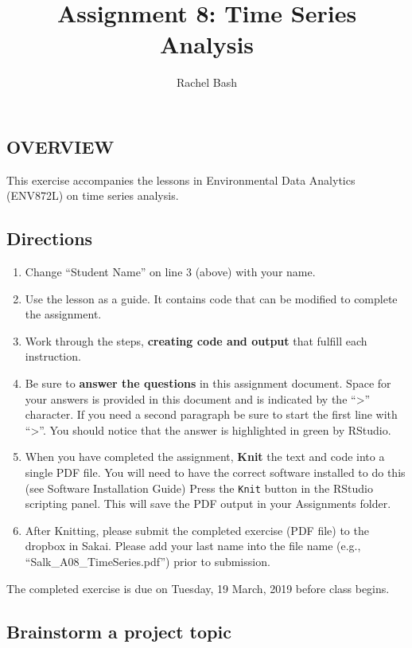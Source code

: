 \documentclass[]{article}
\title{Assignment 8: Time Series Analysis}
\author{Rachel Bash}
\date{}
\providecommand{\tightlist}{%
  \setlength{\itemsep}{0pt}\setlength{\parskip}{0pt}}
\begin{document}
\maketitle

\subsection{OVERVIEW}\label{overview}

This exercise accompanies the lessons in Environmental Data Analytics
(ENV872L) on time series analysis.

\subsection{Directions}\label{directions}

\begin{enumerate}
\def\labelenumi{\arabic{enumi}.}
\tightlist
\item
  Change ``Student Name'' on line 3 (above) with your name.
\item
  Use the lesson as a guide. It contains code that can be modified to
  complete the assignment.
\item
  Work through the steps, \textbf{creating code and output} that fulfill
  each instruction.
\item
  Be sure to \textbf{answer the questions} in this assignment document.
  Space for your answers is provided in this document and is indicated
  by the ``\textgreater{}'' character. If you need a second paragraph be
  sure to start the first line with ``\textgreater{}''. You should
  notice that the answer is highlighted in green by RStudio.
\item
  When you have completed the assignment, \textbf{Knit} the text and
  code into a single PDF file. You will need to have the correct
  software installed to do this (see Software Installation Guide) Press
  the \texttt{Knit} button in the RStudio scripting panel. This will
  save the PDF output in your Assignments folder.
\item
  After Knitting, please submit the completed exercise (PDF file) to the
  dropbox in Sakai. Please add your last name into the file name (e.g.,
  ``Salk\_A08\_TimeSeries.pdf'') prior to submission.
\end{enumerate}

The completed exercise is due on Tuesday, 19 March, 2019 before class
begins.

\subsection{Brainstorm a project
topic}\label{brainstorm-a-project-topic}
\end{document}
